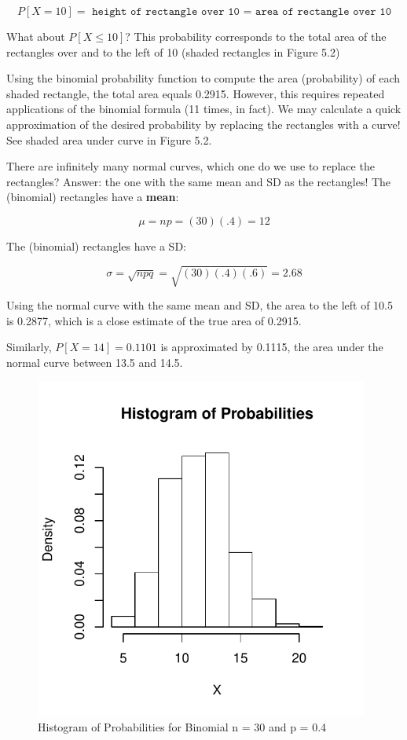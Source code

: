\documentclass[11pt, chapterprefix=true]{scrbook}\usepackage[]{graphicx}\usepackage[]{color}
\begin{document}
\begin{equation*}
P[X = 10] = \texttt{ height of rectangle over 10 = area of rectangle over 10}
\end{equation*}

What about $P[X \le 10]$?  This probability corresponds to the total area of the rectangles over and to the left of 10 (shaded rectangles in Figure 5.2)

Using the binomial probability function to compute the area (probability) of each
shaded rectangle, the total area equals 0.2915.  However, this requires repeated applications of the binomial formula (11 times, in fact).  We may calculate a quick approximation of the desired probability by replacing the rectangles with a curve!  See shaded area under curve in Figure 5.2.

There are infinitely many normal curves, which one do we use to replace the rectangles?  Answer: the one with the same mean and SD as the rectangles!  The (binomial) rectangles have a \textbf{mean}:

\begin{equation*}
\mu = np = (30)(.4) = 12
\end{equation*}

The (binomial) rectangles have a SD:

\begin{equation*}
\sigma = \sqrt{npq} = \sqrt{(30)(.4)(.6)} = 2.68
\end{equation*}

Using the normal curve with the same mean and SD, the area to the left of 10.5 is 0.2877, which is a close estimate of the true area of 0.2915.

Similarly, $P[X = 14] = 0.1101$ is approximated by 0.1115, the area under the normal curve between 13.5 and 14.5.

\begin{figure}[ht]
\caption{Histogram of Probabilities for Binomial n = 30 and p = 0.4}


{\centering \includegraphics[width=11cm]{figure/LBL5b-1} 

}



\end{figure}
\end{document}
